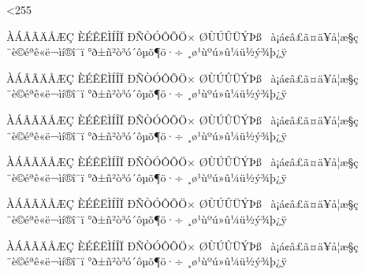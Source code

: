 
\def\activate{\def\do##1{\catcode`##1=13}}
\def\deactivate{\def\do##1{\catcode`##1=12}}
\def\stringate{\def\do##1{\def##1{\string##1}}}
\def\noexpandate{\def\do##1{\def##1{\noexpand##1}}}

\def\activateall{\count@=128 \loop \catcode\count@=13
 \ifnum\count@<255 \advance\count@1 \repeat}
\def\deactivateall{\count@=128 \loop \catcode{}
 \ifnum\count@<255 \advance{} \repeat}

\deactivateall %

\def\dohigh{%
 \do^^80\do^^81\do^^82\do^^83\do^^84\do^^85\do^^86\do^^87%
 \do^^88\do^^89\do^^8a\do^^8b\do^^8c\do^^8d\do^^8e\do^^8f%
 \do^^90\do^^91\do^^92\do^^93\do^^94\do^^95\do^^96\do^^97%
 \do^^98\do^^99\do^^9a\do^^9b\do^^9c\do^^9d\do^^9e\do^^9f%
 \do^^a0\do^^a1\do^^a2\do^^a3\do^^a4\do^^a5\do^^a6\do^^a7%
 \do^^a8\do^^a9\do^^aa\do^^ab\do^^ac\do^^ad\do^^ae\do^^af%
 \do^^b0\do^^b1\do^^b2\do^^b3\do^^b4\do^^b5\do^^b6\do^^b7%
 \do^^b8\do^^b9\do^^ba\do^^bb\do^^bc\do^^bd\do^^be\do^^bf%
 \do^^c0\do^^c1\do^^c2\do^^c3\do^^c4\do^^c5\do^^c6\do^^c7%
 \do^^c8\do^^c9\do^^ca\do^^cb\do^^cc\do^^cd\do^^ce\do^^cf%
 \do^^d0\do^^d1\do^^d2\do^^d3\do^^d4\do^^d5\do^^d6\do^^d7%
 \do^^d8\do^^d9\do^^da\do^^db\do^^dc\do^^dd\do^^de\do^^df%
 \do^^e0\do^^e1\do^^e2\do^^e3\do^^e4\do^^e5\do^^e6\do^^e7%
 \do^^e8\do^^e9\do^^ea\do^^eb\do^^ec\do^^ed\do^^ee\do^^ef%
 \do^^f0\do^^f1\do^^f2\do^^f3\do^^f4\do^^f5\do^^f6\do^^f7%
 \do^^f8\do^^f9\do^^fa\do^^fb\do^^fc\do^^fd\do^^fe\do^^ff%
}

\def\doutfA{%
 \do^^80^^c0\do^^81^^c1\do^^82^^c2\do^^83^^c3\do^^84^^c4\do^^85^^c5\do^^86^^c6\do^^87^^c7%
 \do^^88^^c8\do^^89^^c9\do^^8a^^ca\do^^8b^^cb\do^^8c^^cc\do^^8d^^cd\do^^8e^^ce\do^^8f^^cf%
 \do^^90^^d0\do^^91^^d1\do^^92^^d2\do^^93^^d3\do^^94^^d4\do^^95^^d5\do^^96^^d6\do^^97^^d7%
 \do^^98^^d8\do^^99^^d9\do^^9a^^da\do^^9b^^db\do^^9c^^dc\do^^9d^^dd\do^^9e^^de\do^^9f^^df%
 \do^^a0^^e0\do^^a1^^e1\do^^a2^^e2\do^^a3^^e3\do^^a4^^e4\do^^a5^^e5\do^^a6^^e6\do^^a7^^e7%
 \do^^a8^^e8\do^^a9^^e9\do^^aa^^ea\do^^ab^^eb\do^^ac^^ec\do^^ad^^ed\do^^ae^^ee\do^^af^^ef%
 \do^^b0^^f0\do^^b1^^f1\do^^b2^^f2\do^^b3^^f3\do^^b4^^f4\do^^b5^^f5\do^^b6^^f6\do^^b7^^f7%
 \do^^b8^^f8\do^^b9^^f9\do^^ba^^fa\do^^bb^^fb\do^^bc^^fc\do^^bd^^fd\do^^be^^fe\do^^bf^^ff%
}

\def\do#1#2{\expandafter\def
 \csname\string^^c2\string#1@utf\endcsname{\string^^c2\string#1}}\doutfA
\def\do#1#2{\expandafter\def
 \csname\string^^c3\string#1@utf\endcsname{\string^^c3\string#1}}\doutfA
\def\do#1#2{\expandafter\def
 \csname\string^^c2\string#1@pdf\endcsname{\string#1}}\doutfA
\def\do#1#2{\expandafter\def
 \csname\string^^c3\string#1@pdf\endcsname{\string#2}}\doutfA
\def\do#1#2{\expandafter\def
 \csname\string^^c2\string#1@iso\endcsname{\string#1}}\doutfA
\def\do#1#2{\expandafter\def
 \csname\string^^c3\string#1@iso\endcsname{\string#2}}\doutfA

